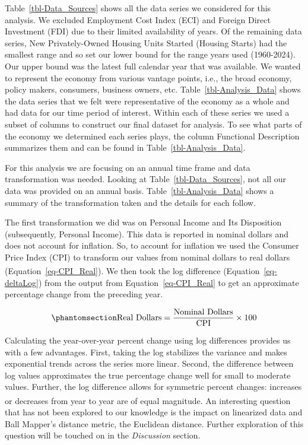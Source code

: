 \documentclass[10pt, letterpaper]{article}
\begin{document}
Table~\ref{tbl-Data_Sources} shows all the data series we considered for
this analysis. We excluded Employment Cost Index (ECI) and Foreign
Direct Investment (FDI) due to their limited availability of years. Of
the remaining data series, New Privately-Owned Housing Units Started
(Housing Starts) had the smallest range and so set our lower bound for
the range years used (1960-2024). Our upper bound was the latest full
calendar year that was available. We wanted to represent the economy
from various vantage points, i.e., the broad economy, policy makers,
consumers, business owners, etc. Table~\ref{tbl-Analysis_Data} shows the
data series that we felt were representative of the economy as a whole
and had data for our time period of interest. Within each of these
series we used a subset of columns to construct our final dataset for
analysis. To see what parts of the economy we determined each series
plays, the column Functional Description summarizes them and can be
found in Table~\ref{tbl-Analysis_Data}.

For this analysis we are focusing on an annual time frame and data
transformation was needed. Looking at Table~\ref{tbl-Data_Sources}, not
all our data was provided on an annual basis.
Table~\ref{tbl-Analysis_Data} shows a summary of the transformation
taken and the details for each follow.

The first transformation we did was on Personal Income and Its
Disposition (subsequently, Personal Income). This data is reported in
nominal dollars and does not account for inflation. So, to account for
inflation we used the Consumer Price Index (CPI) to transform our values
from nominal dollars to real dollars
(Equation~\ref{eq-CPI_Real}).\textsuperscript{}
We then took the log difference (Equation~\ref{eq-deltaLog}) from the
output from Equation~\ref{eq-CPI_Real} to get an approximate percentage
change from the preceding year.

\begin{equation}\phantomsection\label{eq-CPI_Real}{
\text{Real Dollars} = \frac{\text{Nominal Dollars}}{\text{CPI}} \times 100
}\end{equation}

Calculating the year-over-year percent change using log differences
provides us with a few advantages. First, taking the log stabilizes the
variance and makes exponential trends across the series more linear.
Second, the difference between log values approximates the true
percentage change well for small to moderate values. Further, the log
difference allows for symmetric percent changes: increases or decreases
from year to year are of equal
magnitude.\textsuperscript{}
An interesting question that has not been explored to our knowledge is
the impact on linearized data and Ball Mapper's distance metric, the
Euclidean distance. Further exploration of this question will be touched
on in the \emph{Discussion} section.
\end{document}
